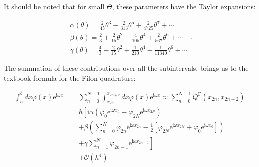 It should be noted that for small $\Theta$, these parameters have the Taylor expansions:

\begin{equation}
    \begin{array}{l}
        \alpha(\theta)=\frac{2}{45} \theta^{3}-\frac{2}{313} \theta^{5}+\frac{2}{4725} \theta^{7}+\cdots \\
        \beta(\theta)=\frac{2}{3}+\frac{2}{15} \theta^{2}-\frac{4}{105} \theta^{4}+\frac{2}{567} \theta^{6}+\cdots \\
        \gamma(\theta)=\frac{4}{3}-\frac{2}{15} \theta^{2}+\frac{1}{210} \theta^{4}-\frac{1}{11340} \theta^{6}+\cdots
        \end{array}.
\end{equation}

The summation of these contributions over all the subintervals, brings us to the textbook formula for the Filon quadrature:

\begin{equation}
    \begin{aligned}
        \int_{a}^{b} d x \varphi(x) \mathrm{e}^{\mathrm{i} \omega x}=& \sum_{n=0}^{N-1} \int_{x_{2 n}}^{x_{2 n+2}} d x \varphi(x) \mathrm{e}^{\mathrm{i} \omega x} \approx \sum_{n=0}^{N-1} Q^{\text {F}}\left(x_{2 n}, x_{2 n+2}\right) \\
        =& h\left[\mathrm{i} \alpha\left(\varphi_{0} \mathrm{e}^{\mathrm{i} \omega x_{0}}-\varphi_{2 N} \mathrm{e}^{\mathrm{i} \omega x_{2 N}}\right)\right.\\
        &+\beta\left(\sum_{n=0}^{N} \varphi_{2 n} \mathrm{e}^{\mathrm{i} \omega x_{2 n}}-\frac{1}{2}\left[\varphi_{2 N} \mathrm{e}^{\mathrm{i} \omega x_{2 N}}+\varphi_{0} \mathrm{e}^{\mathrm{i} \omega x_{0}}\right]\right) \\
        &\left.+\gamma \sum_{n=1}^{N} \varphi_{2 n-1} \mathrm{e}^{\mathrm{i} \omega x_{2 n-1}}\right] \\
        &+\mathcal{O}\left(h^{4}\right)
    \end{aligned} \label{FilonQ}
\end{equation}

